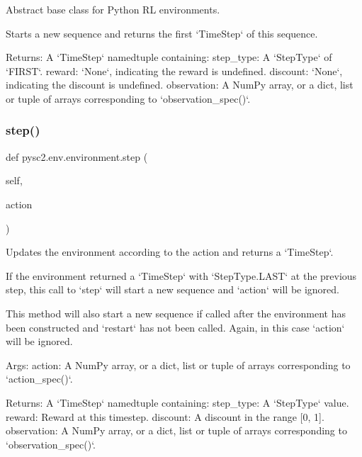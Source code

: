 \begin{DoxyVerb}Abstract base class for Python RL environments.\end{DoxyVerb}
\begin{DoxyVerb}Starts a new sequence and returns the first `TimeStep` of this sequence.

Returns:
  A `TimeStep` namedtuple containing:
    step_type: A `StepType` of `FIRST`.
    reward: `None`, indicating the reward is undefined.
    discount: `None`, indicating the discount is undefined.
    observation: A NumPy array, or a dict, list or tuple of arrays
      corresponding to `observation_spec()`.
\end{DoxyVerb}
 \mbox{\label{namespacepysc2_1_1env_1_1environment_a33a961f4eae86ee2fd8faf7bfa56ec28}} 
\subsubsection{\texorpdfstring{step()}{step()}}
{\footnotesize\ttfamily def pysc2.\+env.\+environment.\+step (\begin{DoxyParamCaption}\item[{}]{self,  }\item[{}]{action }\end{DoxyParamCaption})}

\begin{DoxyVerb}Updates the environment according to the action and returns a `TimeStep`.

If the environment returned a `TimeStep` with `StepType.LAST` at the
previous step, this call to `step` will start a new sequence and `action`
will be ignored.

This method will also start a new sequence if called after the environment
has been constructed and `restart` has not been called. Again, in this case
`action` will be ignored.

Args:
  action: A NumPy array, or a dict, list or tuple of arrays corresponding to
    `action_spec()`.

Returns:
  A `TimeStep` namedtuple containing:
    step_type: A `StepType` value.
    reward: Reward at this timestep.
    discount: A discount in the range [0, 1].
    observation: A NumPy array, or a dict, list or tuple of arrays
      corresponding to `observation_spec()`.
\end{DoxyVerb}
 